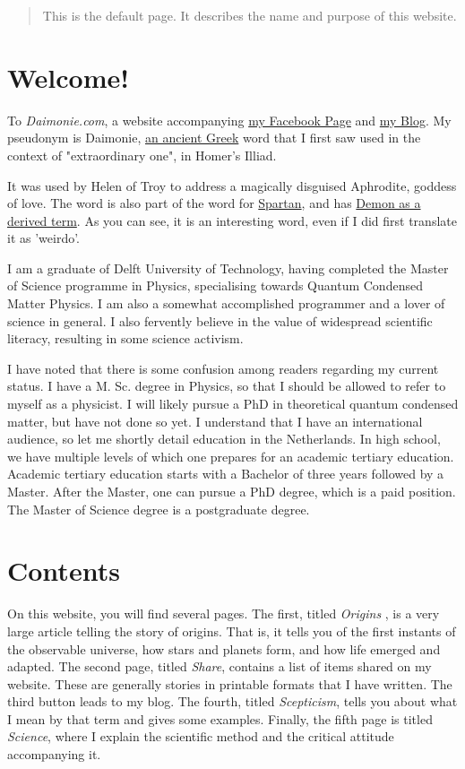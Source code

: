 \begin{abstract}
    This is the default page. It describes the name and purpose of this website.
\end{abstract}

\section{Welcome!} 
To \emph{Daimonie.com}, a website accompanying \href{https://www.facebook.com/daimonie}{my Facebook Page} and
\href{./blog"}{my Blog}. My pseudonym is Daimonie,
\href{https://goo.gl/xwLXc1}{an ancient Greek} word
that I first saw used in  the context of "extraordinary one", in Homer's Illiad.  


It was used by Helen of Troy to address a magically disguised Aphrodite, goddess of love. The word is also part of the word for
\href{https://goo.gl/kktWCr}{Spartan}, and has \href{https://goo.gl/sKxvMo}{Demon as a derived term}. As you can see, it is an interesting word, even if I did first translate it as 'weirdo'.

I am a graduate of Delft University of Technology, having completed the Master of Science programme in Physics, specialising towards
Quantum Condensed Matter Physics. I am also a somewhat accomplished programmer and a lover of science in general. I also fervently believe
in the value of widespread scientific literacy, resulting in some science activism. 

I have noted that there is some confusion among readers regarding my current status. I have a M. Sc. degree in Physics, so that I should be
allowed to refer to myself as a physicist. I will likely pursue a PhD in theoretical quantum condensed matter, but have not done so yet. I understand
that I have an international audience, so let me shortly detail education in the Netherlands. In high school, we have multiple levels of which
one prepares for an academic tertiary education. Academic tertiary education starts with a Bachelor of three years followed by a Master.
After the Master, one can pursue a PhD degree, which is a paid position. The Master of Science degree is a postgraduate degree.
\section{	Contents } 
On this website, you will find several pages. The first, titled \emph{ Origins }, is a very large article telling the story of origins.
That is, it tells you of the first instants of the observable universe, how stars and planets form, and how life emerged and adapted. The
second page, titled \emph{Share}, contains a list of items shared on my website. These are generally stories in printable formats that I
have written. The third button leads to my blog. The fourth, titled \emph{Scepticism}, tells you about what I mean by that term and gives
some examples. Finally, the fifth page is titled \emph{Science}, where I explain the scientific method and the critical attitude accompanying
it.

